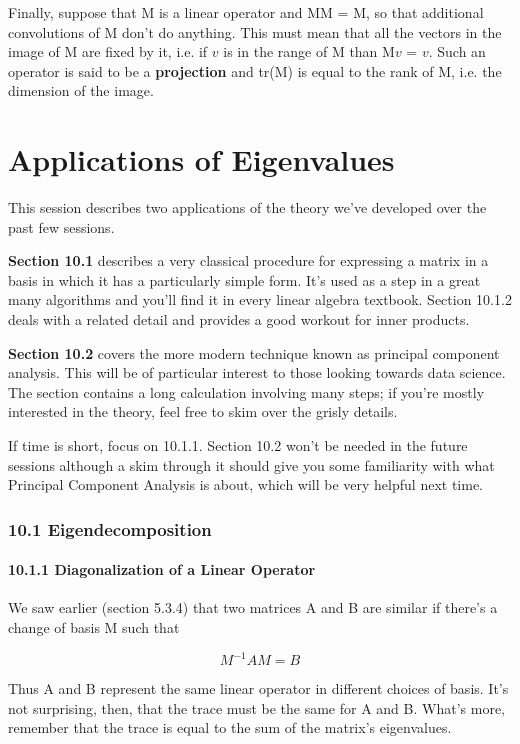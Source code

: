 \documentclass[oneside,english]{amsbook}
\numberwithin{section}{chapter}
\theoremstyle{plain}
\theoremstyle{definition}
\begin{document}
Finally, suppose that M is a linear operator and MM = M, so that
additional convolutions of M don't do anything. This must mean that all
the vectors in the image of M are fixed by it, i.e. if $v$ is in the
range of M than M$v$ = $v$. Such an operator is said to be a
\textbf{projection} and tr(M) is equal to the rank of M, i.e. the
dimension of the image.

\chapter{Applications of Eigenvalues}

This session describes two applications of the theory we've developed
over the past few sessions.

\textbf{Section 10.1} describes a very classical procedure for
expressing a matrix in a basis in which it has a particularly simple
form. It's used as a step in a great many algorithms and you'll find it
in every linear algebra textbook. Section 10.1.2 deals with a related
detail and provides a good workout for inner products.

\textbf{Section 10.2} covers the more modern technique known as
principal component analysis. This will be of particular interest to
those looking towards data science. The section contains a long
calculation involving many steps; if you're mostly interested in the
theory, feel free to skim over the grisly details.

If time is short, focus on 10.1.1. Section 10.2 won't be needed in the
future sessions although a skim through it should give you some
familiarity with what Principal Component Analysis is about, which will
be very helpful next time.

\subsection{10.1 Eigendecomposition}\label{eigendecomposition}

\subsubsection{10.1.1 Diagonalization of a Linear
	Operator}\label{diagonalization-of-a-linear-operator}

We saw earlier (section 5.3.4) that two matrices A and B are similar if
there's a change of basis M such that

\[M^{- 1}AM = B\]

Thus A and B represent the same linear operator in different choices of
basis. It's not surprising, then, that the trace must be the same for A
and B. What's more, remember that the trace is equal to the sum of the
matrix's eigenvalues.
\end{document}
